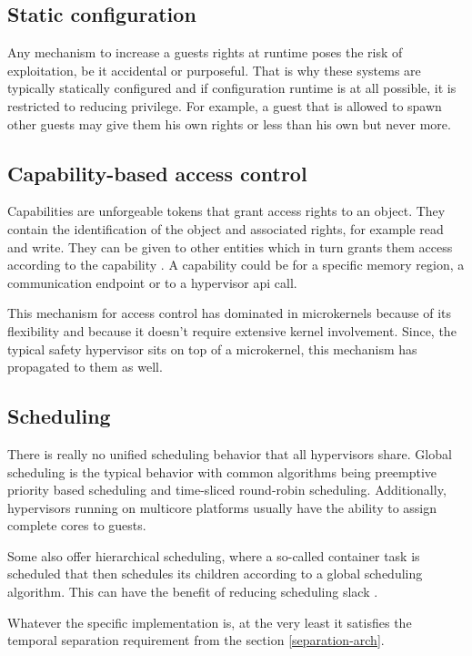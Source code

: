 \subsection{Static configuration}
Any mechanism to increase a guests rights at runtime poses the risk of exploitation, be it accidental or purposeful. That is why these systems are typically statically configured and if configuration runtime is at all possible, it is restricted to reducing privilege. For example, a guest that is allowed to spawn other guests may give them his own rights or less than his own but never more.

\subsection{Capability-based access control}
Capabilities are unforgeable tokens that grant access rights to an object. They contain the identification of the object and associated rights, for example read and write.
They can be given to other entities which in turn grants them access according to the capability \cite{Levy.1984}. A capability could be for a specific memory region, a communication endpoint or to a hypervisor \acrshort{api} call.

This mechanism for access control has dominated in microkernels because of its flexibility and because it doesn't require extensive kernel involvement. Since, the typical safety hypervisor sits on top of a microkernel, this mechanism has propagated to them as well.

\subsection{Scheduling}
There is really no unified scheduling behavior that all hypervisors share. Global scheduling is the typical behavior with common algorithms being preemptive priority based scheduling and time-sliced round-robin scheduling. Additionally, hypervisors running on multicore platforms usually have the ability to assign complete cores to guests.

Some also offer hierarchical scheduling, where a so-called container task is scheduled that then schedules its children according to a global scheduling algorithm. This can have the benefit of reducing scheduling slack \cite{MalcolmS.Mollison.2010}. 

Whatever the specific implementation is, at the very least it satisfies the temporal separation requirement from the section \ref{separation-arch}. 

